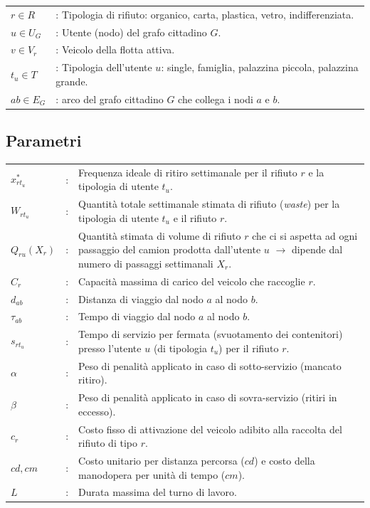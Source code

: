 \begin{tabular}{@{}l>{\raggedright\arraybackslash}p{11cm}}
	$r \in R$   & : Tipologia di rifiuto: organico, carta, plastica, vetro, indifferenziata. \\
	$u \in U_G$   & : Utente (nodo) del grafo cittadino $G$. \\
	$v \in V_r$ & : Veicolo della flotta attiva. \\
	$t_u \in T$ & : Tipologia dell'utente $u$: single, famiglia, palazzina piccola, palazzina grande. \\
	$ab \in E_G$ & : arco del grafo cittadino $G$ che collega i nodi $a$ e $b$.
\end{tabular}

\subsection{Parametri}

\begin{longtable}[l]{@{}ll>{\raggedright\arraybackslash}p{11cm}}
	$x^*_{r t_u}$ & : & Frequenza ideale di ritiro settimanale per il rifiuto $r$ e la tipologia di utente $t_u$. \\
	$W_{r t_u}$ & : & Quantità totale settimanale stimata di rifiuto (\textit{waste}) per la tipologia di utente $t_u$ e il rifiuto $r$. \\
	$Q_{ru}(X_r)$ & : & Quantità stimata di volume di rifiuto $r$ che ci si aspetta ad ogni passaggio del camion prodotta dall'utente $u$ $\rightarrow$ dipende dal numero di passaggi settimanali $X_r$. \\
	$C_r$ & : & Capacità massima di carico del veicolo che raccoglie $r$. \\
	$d_{ab}$ & : & Distanza di viaggio dal nodo $a$ al nodo $b$. \\
	$\tau_{ab}$ & : & Tempo di viaggio dal nodo $a$ al nodo $b$. \\
	$s_{r t_u}$ & : & Tempo di servizio per fermata (svuotamento dei contenitori) presso l'utente $u$ (di tipologia $t_u$) per il rifiuto $r$. \\
	$\alpha$ & : & Peso di penalità applicato in caso di sotto-servizio (mancato ritiro). \\
	$\beta$ & : & Peso di penalità applicato in caso di sovra-servizio (ritiri in eccesso). \\
	$c_r$ & : & Costo fisso di attivazione del veicolo adibito alla raccolta del rifiuto di tipo $r$. \\
	$cd, cm$ & : & Costo unitario per distanza percorsa ($cd$) e costo della manodopera per unità di tempo ($cm$). \\
	$L$ & : & Durata massima del turno di lavoro. \\
\end{longtable}

